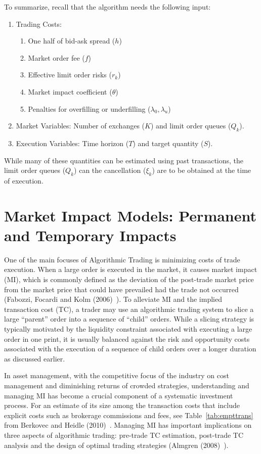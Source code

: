 To summarize, recall that the algorithm needs the following input:
	\begin{enumerate}[--]
	\item Trading Costs: 
		\begin{enumerate}
		\item One half of bid-ask spread ($h$)
		\item Market order fee ($f$)
		\item Effective limit order risks ($r_k$)
		\item Market impact coefficient ($\theta$)
		\item Penalties for overfilling or underfilling ($\lambda_0,\lambda_u$)
		\end{enumerate}
	\item Market Variables: Number of exchanges ($K$) and limit order queues ($Q_k$).
	\item Execution Variables: Time horizon ($T$) and target quantity ($S$).
	\end{enumerate}
While many of these quantities can be estimated using past transactions, the limit order queues ($Q_k$) can the cancellation ($\xi_k$) are to be obtained at the time of execution.


\section{Market Impact Models:  Permanent and Temporary Impacts}


One of the main focuses of Algorithmic Trading is minimizing costs of trade execution. When a large order is executed in the market, it causes market impact (MI), which is commonly defined as the deviation of the post-trade market price from the market price that could have prevailed had the trade not occurred (Fabozzi, Focardi and Kolm (2006)~\cite{ffk}). To alleviate MI and the implied transaction cost (TC), a trader may use an algorithmic trading system to slice a large ``parent'' order into a sequence of ``child'' orders. While a slicing strategy is typically motivated by the liquidity constraint associated with executing a large order in one print, it is usually balanced against the risk and opportunity costs associated with the execution of a sequence of child orders over a longer duration as discussed earlier.


In asset management, with the competitive focus of the industry on cost management and diminishing returns of crowded strategies, understanding and managing MI has become a crucial component of a systematic investment process. For an estimate of its size among the transaction costs that include explicit costs such as brokerage commissions and fees, see Table~\ref{tab:empttrans} from Berkovec and Heidle (2010)~\cite{borkoheidle}. Managing MI has important implications on three aspects of algorithmic trading: pre-trade TC estimation, post-trade TC analysis and the design of optimal trading strategies (Almgren (2008)~\cite{alm2008}).

